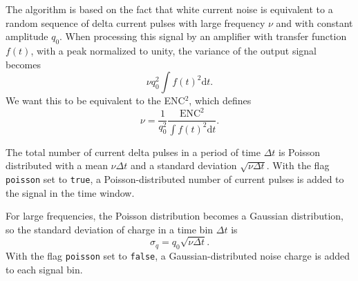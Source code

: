 The algorithm is based on the fact that white current noise is equivalent 
to a random sequence of delta current pulses with large frequency $\nu$ 
and with constant amplitude $q_0$. When processing this signal by an 
amplifier with transfer function $f\left(t\right)$, 
with a peak normalized to unity, the variance of the output signal becomes
\begin{equation*}
  \nu q_{0}^{2} \int f\left(t\right)^{2} \text{d}t.
\end{equation*}
We want this to be equivalent to the ENC$^2$, 
which defines 
\begin{equation*}
\nu = \frac{1}{q_{0}^{2}}\frac{\text{ENC}^2}{\int f\left(t\right)^2 \text{d}t}.
\end{equation*}

The total number of current delta pulses in a period of time $\Delta{t}$ 
is Poisson distributed with a mean $\nu\Delta{t}$ 
and a standard deviation $\sqrt{\nu\Delta{t}}$.
With the flag \texttt{poisson} set to \texttt{true}, a Poisson-distributed 
number of current pulses is added to the signal in the time window.

For large frequencies, the Poisson distribution becomes a 
Gaussian distribution, so the standard deviation of charge 
in a time bin $\Delta{t}$ is 
\begin{equation*}
  \sigma_{q} = q_{0} \sqrt{\nu\Delta{t}}.
\end{equation*}
With the flag \texttt{poisson} set to \texttt{false}, 
a Gaussian-distributed noise charge is added to each signal bin. 
